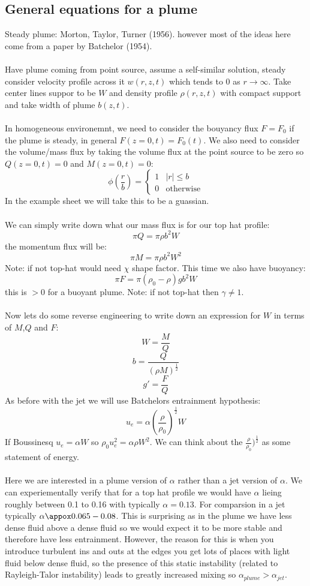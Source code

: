 \documentclass{article}
\begin{document}
\subsection{General equations for a plume}
Steady plume: Morton, Taylor, Turner (1956). however most of the ideas here come from a paper by Batchelor (1954).\\\\
Have plume coming from point source, assume a self-similar solution, steady consider velocity profile across it $w(r,z,t)$ which tends to 0 as $r \rightarrow \infty$. Take center lines suppor to be $W$ and density profile $\rho(r,z,t)$ with compact support and take width of plume $b(z,t)$.\\\\
In homogeneous environemnt, we need to consider the bouyancy flux $F = F_0$ if the plume is steady, in general $F(z=0,t) = F_0(t)$. We also need to consider the volume/mass flux by taking the volume flux at the point source to be zero so $Q(z=0,t) = 0$ and $M(z=0,t) = 0$:\\
$$
 \phi(\frac{r}{b}) = \begin{cases} 1 & |r|\leq b\\ 0 & \text{otherwise} \end{cases}
$$
In the example sheet we will take this to be a guassian.\\\\
We can simply write down what our mass flux is for our top hat profile:
$$
 \pi Q = \pi \rho b^2 W
$$
the momentum flux will be:
$$
 \pi M = \pi \rho b^2 W^2
$$
Note: if not top-hat would need $\chi$ shape factor.
This time we also have buoyancy:
$$
\pi F = \pi ( \rho_0 - \rho) g b^2 W
$$
this is $>0$ for a buoyant plume. Note: if not top-hat then $\gamma \neq 1$.\\\\
Now lets do some reverse engineering to write down an expression for $W$ in terms of $M$,$Q$ and $F$:
$$
 W = \frac{M}{Q}
$$
$$
 b = \frac{Q}{(\rho M)^{\frac{1}{2}}}
$$
$$
 g' = \frac{F}{Q}
$$
As before with the jet we will use Batchelors entrainment hypothesis:
$$
 u_e = \alpha ( \frac{\rho}{\rho_0})^{\frac{1}{2}} W
$$
If Boussinesq $u_e = \alpha W$ so $\rho_0 u_e^2 = \alpha \rho W^2$. We can think about the $\frac{\rho}{\rho_0})^{\frac{1}{2}}$ as some statement of energy.\\\\
Here we are interested in a plume version of $\alpha$ rather than a jet version of $\alpha$. We can experiementally verify that for a top hat profile we would have $\alpha$ lieing roughly between 0.1 to 0.16 with typically $\alpha = 0.13$. For comparsion in a jet typically $\alpha \appox 0.065 - 0.08$. This is surprising as in the plume we have less dense fluid above a dense fluid so we would expect it to be more stable and therefore have less entrainment. However, the reason for this is when you introduce turbulent ins and outs at the edges you get lots of places with light fluid below dense fluid, so the presence of this static instability (related to Rayleigh-Talor instability) leads to greatly increased mixing so $\alpha_{plume} > \alpha_{jet}$.
\end{document}
